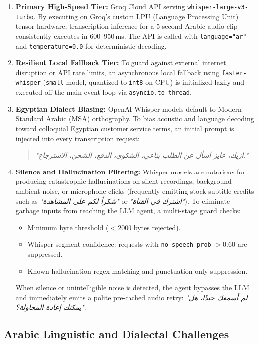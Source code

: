 \begin{enumerate}
    \item \textbf{Primary High-Speed Tier:} Groq Cloud API serving \texttt{whisper-large-v3-turbo}. By executing on Groq's custom LPU (Language Processing Unit) tensor hardware, transcription inference for a 5-second Arabic audio clip consistently executes in 600--950\,ms. The API is called with \texttt{language="ar"} and \texttt{temperature=0.0} for deterministic decoding.
    \item \textbf{Resilient Local Fallback Tier:} To guard against external internet disruption or API rate limits, an asynchronous local fallback using \texttt{faster-whisper} (\texttt{small} model, quantized to \texttt{int8} on CPU) is initialized lazily and executed off the main event loop via \texttt{asyncio.to\_thread}.
    \item \textbf{Egyptian Dialect Biasing:} OpenAI Whisper models default to Modern Standard Arabic (MSA) orthography. To bias acoustic and language decoding toward colloquial Egyptian customer service terms, an initial prompt is injected into every transcription request:
    \begin{quote}
    \textit{"ازيك، عايز أسأل عن الطلب بتاعي، الشكوى، الدفع، الشحن، الاسترجاع."}
    \end{quote}
    \item \textbf{Silence and Hallucination Filtering:} Whisper models are notorious for producing catastrophic hallucinations on silent recordings, background ambient noise, or microphone clicks (frequently emitting stock subtitle credits such as \textit{"شكراً لكم على المشاهدة"} or \textit{"اشترك في القناة"}). To eliminate garbage inputs from reaching the LLM agent, a multi-stage guard checks:
    \begin{itemize}
        \item Minimum byte threshold ($< 2000$ bytes rejected).
        \item Whisper segment confidence: requests with \texttt{no\_speech\_prob} $> 0.60$ are suppressed.
        \item Known hallucination regex matching and punctuation-only suppression.
    \end{itemize}
    When silence or unintelligible noise is detected, the agent bypasses the LLM and immediately emits a polite pre-cached audio retry: \textit{"لم أسمعك جيدًا، هل يمكنك إعادة المحاولة؟"}.
\end{enumerate}

\subsection{Arabic Linguistic and Dialectal Challenges}
\label{subsec:arabic_challenges}

